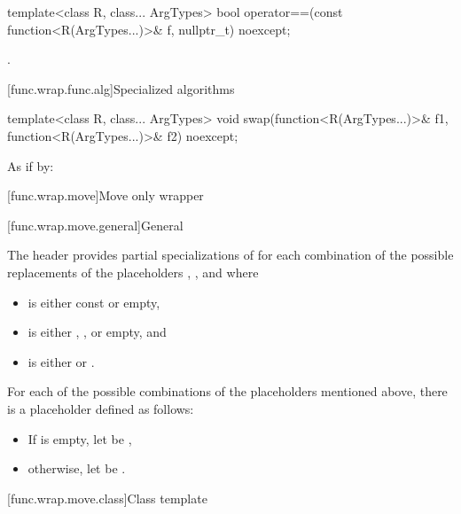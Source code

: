 %
\begin{itemdecl}
template<class R, class... ArgTypes>
  bool operator==(const function<R(ArgTypes...)>& f, nullptr_t) noexcept;
\end{itemdecl}

\begin{itemdescr}
\pnum
\returns
{}.
\end{itemdescr}

[func.wrap.func.alg]{Specialized algorithms}

%
\begin{itemdecl}
template<class R, class... ArgTypes>
  void swap(function<R(ArgTypes...)>& f1, function<R(ArgTypes...)>& f2) noexcept;
\end{itemdecl}

\begin{itemdescr}
\pnum
\effects
As if by: 
\end{itemdescr}%

[func.wrap.move]{Move only wrapper}

[func.wrap.move.general]{General}

\pnum
The header provides partial specializations of 
for each combination of the possible replacements
of the placeholders \cv{}, , and  where
\begin{itemize}
\item
\cv{} is either const or empty,
\item
{} is either \tcode{\&}, \tcode{\&\&}, or empty, and
\item
{} is either  or .
\end{itemize}

\pnum
For each of the possible combinations of the placeholders mentioned above,
there is a placeholder  defined as follows:
\begin{itemize}
\item
If  is empty, let  be \cv{}\tcode{\&},
\item
otherwise, let  be \cv{} .
\end{itemize}

[func.wrap.move.class]{Class template }

